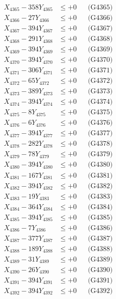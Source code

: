\documentclass[a4paper,10pt]{article}
\begin{document}
{\begin{align}
X_{4365} - 358Y_{4365} &\leq +0 && \text{(G4365)} \\
X_{4366} - 27Y_{4366} &\leq +0 && \text{(G4366)} \\
X_{4367} - 394Y_{4367} &\leq +0 && \text{(G4367)} \\
X_{4368} - 291Y_{4368} &\leq +0 && \text{(G4368)} \\
X_{4369} - 394Y_{4369} &\leq +0 && \text{(G4369)} \\
X_{4370} - 394Y_{4370} &\leq +0 && \text{(G4370)} \\
\allowbreak
X_{4371} - 306Y_{4371} &\leq +0 && \text{(G4371)} \\
X_{4372} - 65Y_{4372} &\leq +0 && \text{(G4372)} \\
X_{4373} - 389Y_{4373} &\leq +0 && \text{(G4373)} \\
X_{4374} - 394Y_{4374} &\leq +0 && \text{(G4374)} \\
X_{4375} - 8Y_{4375} &\leq +0 && \text{(G4375)} \\
X_{4376} - 6Y_{4376} &\leq +0 && \text{(G4376)} \\
X_{4377} - 394Y_{4377} &\leq +0 && \text{(G4377)} \\
X_{4378} - 282Y_{4378} &\leq +0 && \text{(G4378)} \\
X_{4379} - 78Y_{4379} &\leq +0 && \text{(G4379)} \\
X_{4380} - 394Y_{4380} &\leq +0 && \text{(G4380)} \\
\allowbreak
X_{4381} - 167Y_{4381} &\leq +0 && \text{(G4381)} \\
X_{4382} - 394Y_{4382} &\leq +0 && \text{(G4382)} \\
X_{4383} - 19Y_{4383} &\leq +0 && \text{(G4383)} \\
X_{4384} - 364Y_{4384} &\leq +0 && \text{(G4384)} \\
X_{4385} - 394Y_{4385} &\leq +0 && \text{(G4385)} \\
X_{4386} - 7Y_{4386} &\leq +0 && \text{(G4386)} \\
X_{4387} - 377Y_{4387} &\leq +0 && \text{(G4387)} \\
X_{4388} - 189Y_{4388} &\leq +0 && \text{(G4388)} \\
X_{4389} - 31Y_{4389} &\leq +0 && \text{(G4389)} \\
X_{4390} - 26Y_{4390} &\leq +0 && \text{(G4390)} \\
\allowbreak
X_{4391} - 394Y_{4391} &\leq +0 && \text{(G4391)} \\
X_{4392} - 394Y_{4392} &\leq +0 && \text{(G4392)} \\

\end{align}}
\end{document}
